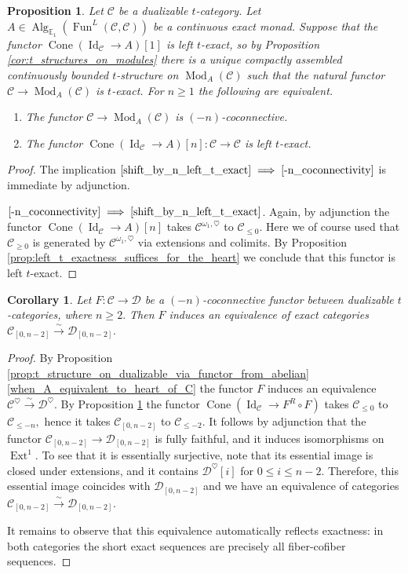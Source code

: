 \documentclass[11pt,leqno]{amsart}
\newcommand{\Implies}[2]{$\text{\ref{#1}}\implies\text{\ref{#2}}$}
\newtheorem{prop}[theo]{Proposition}
\newtheorem{cor}[theo]{Corollary}
\numberwithin{equation}{section}
\newcommand{\xto}{\xrightarrow}
\newcommand{\Cone}{\operatorname{Cone}}
\newcommand{\bE}{{\mathbb E}}
\newcommand{\cD}{{\mathcal D}}
\newcommand{\cC}{{\mathcal C}}
\newcommand{\Fun}{\operatorname{Fun}}
\newcommand{\Ext}{\operatorname{Ext}}
\newcommand{\Id}{\operatorname{Id}}
\newcommand{\Alg}{\operatorname{Alg}}
\newcommand{\Mod}{\operatorname{Mod}}
\begin{document}
\begin{prop}\label{prop:-n_coconnectivity_via_monads}
	Let $\cC$ be a dualizable $t$-category. Let $A\in\Alg_{\bE_1}(\Fun^L(\cC,\cC))$ be a continuous exact monad. Suppose that the functor $\Cone(\Id_{\cC}\to A)[1]$ is left $t$-exact, so by Proposition \ref{cor:t_structures_on_modules} there is a unique compactly assembled continuously bounded $t$-structure on $\Mod_A(\cC)$ such that the natural functor $\cC\to\Mod_A(\cC)$ is $t$-exact. For $n\geq 1$ the following are equivalent.
	
	\begin{enumerate}[label=(\roman*),ref=(\roman*)]
		\item The functor $\cC\to\Mod_A(\cC)$ is $(-n)$-coconnective. \label{-n_coconnectivity}
		\item The functor $\Cone(\Id_{\cC}\to A)[n]:\cC\to\cC$ is left $t$-exact. \label{shift_by_n_left_t_exact} 
	\end{enumerate}
\end{prop}

\begin{proof}
The implication \Implies{shift_by_n_left_t_exact}{-n_coconnectivity} is immediate by adjunction.

\Implies{-n_coconnectivity}{shift_by_n_left_t_exact}. Again, by adjunction the functor $\Cone(\Id_{\cC}\to A)[n]$ takes $\cC^{\omega_1,\heartsuit}$ to $\cC_{\leq 0}.$ Here we of course used that $\cC_{\geq 0}$ is generated by $\cC^{\omega_1,\heartsuit}$ via extensions and colimits. By Proposition \ref{prop:left_t_exactness_suffices_for_the_heart} we conclude that this functor is left $t$-exact.
\end{proof}

\begin{cor}\label{cor:equiv_on_C_0_n}
	Let $F:\cC\to\cD$ be a $(-n)$-coconnective functor between dualizable $t$-categories, where $n\geq 2.$ Then $F$ induces an equivalence of exact categories $\cC_{[0,n-2]}\xto{\sim} \cD_{[0,n-2]}.$ 
\end{cor}

\begin{proof}
	By Proposition \ref{prop:t_structure_on_dualizable_via_functor_from_abelian} \ref{when_A_equivalent_to_heart_of_C} the functor $F$ induces an equivalence $\cC^{\heartsuit}\xto{\sim}\cD^{\heartsuit}.$ By Proposition \ref{prop:-n_coconnectivity_via_monads} the functor $\Cone(\Id_{\cC}\to F^R\circ F)$ takes $\cC_{\leq 0}$ to $\cC_{\leq -n},$ hence it takes $\cC_{[0,n-2]}$ to $\cC_{\leq -2}.$ It follows by adjunction that the functor $\cC_{[0,n-2]}\to \cD_{[0,n-2]}$ is fully faithful, and it induces isomorphisms on $\Ext^1.$ To see that it is essentially surjective, note that its essential image is closed under extensions, and it contains $\cD^{\heartsuit}[i]$ for $0\leq i\leq n-2.$ Therefore, this essential image coincides with $\cD_{[0,n-2]}$ and we have an equivalence of categories $\cC_{[0,n-2]}\xto{\sim}\cD_{[0,n-2]}.$
	
	It remains to observe that this equivalence automatically reflects exactness: in both categories the short exact sequences are precisely all fiber-cofiber sequences.
\end{proof}
\end{document}
